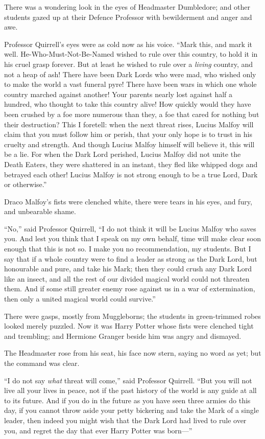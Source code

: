 There was a wondering look in the eyes of Headmaster Dumbledore; and other students gazed up at their Defence Professor with bewilderment and anger and awe.

Professor Quirrell’s eyes were as cold now as his voice. “Mark this, and mark it well. He-Who-Must-Not-Be-Named wished to rule over this country, to hold it in his cruel grasp forever. But at least he wished to rule over a \emph{living} country, and not a heap of ash! There have been Dark Lords who were mad, who wished only to make the world a vast funeral pyre! There have been wars in which one whole country marched against another! Your parents nearly lost against half a hundred, who thought to take this country alive! How quickly would they have been crushed by a foe more numerous than they, a foe that cared for nothing but their destruction? This I foretell: when the next threat rises, Lucius Malfoy will claim that you must follow him or perish, that your only hope is to trust in his cruelty and strength. And though Lucius Malfoy himself will believe it, this will be a lie. For when the Dark Lord perished, Lucius Malfoy did not unite the Death Eaters, they were shattered in an instant, they fled like whipped dogs and betrayed each other! Lucius Malfoy is not strong enough to be a true Lord, Dark or otherwise.”

Draco Malfoy’s fists were clenched white, there were tears in his eyes, and fury, and unbearable shame.

“No,” said Professor Quirrell, “I do not think it will be Lucius Malfoy who saves you. And lest you think that I speak on my own behalf, time will make clear soon enough that this is not so. I make you no recommendation, my students. But I say that if a whole country were to find a leader as strong as the Dark Lord, but honourable and pure, and take his Mark; then they could crush any Dark Lord like an insect, and all the rest of our divided magical world could not threaten them. And if some still greater enemy rose against us in a war of extermination, then only a united magical world could survive.”

There were gasps, mostly from Muggleborns; the students in green-trimmed robes looked merely puzzled. Now it was Harry Potter whose fists were clenched tight and trembling; and Hermione Granger beside him was angry and dismayed.

The Headmaster rose from his seat, his face now stern, saying no word as yet; but the command was clear.

“I do not say \emph{what} threat will come,” said Professor Quirrell. “But you will not live all your lives in peace, not if the past history of the world is any guide at all to its future. And if you do in the future as you have seen three armies do this day, if you cannot throw aside your petty bickering and take the Mark of a single leader, then indeed you might wish that the Dark Lord had lived to rule over you, and regret the day that ever Harry Potter was born—”

